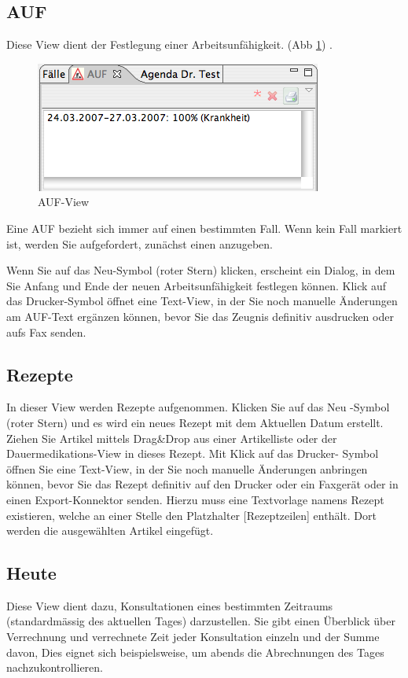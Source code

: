 \subsection{AUF}
Diese View dient der Festlegung einer Arbeitsunfähigkeit. (Abb \ref{fig:auf})
 . %
\begin{figure}[htp]
\begin{center}
  \includegraphics{images/aufview}
  \caption{AUF-View}
  \label{fig:auf}
\end{center}
\end{figure}
Eine AUF bezieht sich immer auf einen bestimmten Fall. Wenn kein Fall markiert
ist, werden Sie aufgefordert, zunächst einen anzugeben.

Wenn Sie auf das \glqq Neu\grqq -Symbol (roter Stern) klicken, erscheint ein
Dialog, in dem Sie Anfang und Ende der neuen Arbeitsunfähigkeit festlegen
können. Klick auf das \glqq Drucker\grqq -Symbol öffnet eine Text-View, in der
Sie noch manuelle Änderungen am AUF-Text ergänzen können, bevor Sie das Zeugnis
definitiv ausdrucken oder aufs Fax senden.

\subsection{Rezepte}
In dieser View werden Rezepte aufgenommen. Klicken Sie auf das \glqq Neu\grqq
-Symbol (roter Stern) und es wird ein neues Rezept mit dem Aktuellen Datum
erstellt. Ziehen Sie Artikel mittels Drag\&Drop aus einer Artikelliste oder der
Dauermedikations-View in dieses Rezept. Mit Klick auf das \glqq Drucker\grqq -
Symbol öffnen Sie eine Text-View, in der Sie noch manuelle Änderungen anbringen
können, bevor Sie das Rezept definitiv auf den Drucker oder ein Faxgerät oder in
einen Export-Konnektor senden.
Hierzu muss eine Textvorlage namens \glqq Rezept\grqq
existieren, welche an einer Stelle den Platzhalter [Rezeptzeilen] enthält. Dort
werden die ausgewählten Artikel eingefügt.

\subsection{Heute}
Diese View dient dazu, Konsultationen eines bestimmten Zeitraums (standardmässig
des aktuellen Tages) darzustellen. Sie gibt einen Überblick über Verrechnung und
verrechnete Zeit jeder Konsultation einzeln und der Summe davon, Dies eignet
sich beispielsweise, um abends die Abrechnungen des Tages nachzukontrollieren.

